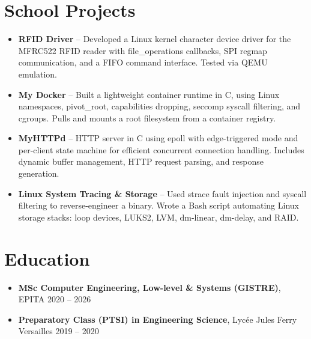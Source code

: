 \documentclass[9pt,a4paper]{article}
\begin{document}
\section*{School Projects}
\begin{tcolorbox}[mybox]
\begin{itemize}
\item \textbf{RFID Driver} -- Developed a Linux kernel character device driver for the MFRC522 RFID reader with file\_operations callbacks, SPI regmap communication, and a FIFO command interface. Tested via QEMU emulation.

\item \textbf{My Docker} -- Built a lightweight container runtime in C, using Linux namespaces, pivot\_root, capabilities dropping, seccomp syscall filtering, and cgroups. Pulls and mounts a root filesystem from a container registry.

\item \textbf{MyHTTPd} -- HTTP server in C using epoll with edge-triggered mode and per-client state machine for efficient concurrent connection handling. Includes dynamic buffer management, HTTP request parsing, and response generation.

\item \textbf{Linux System Tracing \& Storage} -- Used strace fault injection and syscall filtering to reverse-engineer a binary. Wrote a Bash script automating Linux storage stacks: loop devices, LUKS2, LVM, dm-linear, dm-delay, and RAID.
\end{itemize}
\end{tcolorbox}


\section*{Education}
\begin{tcolorbox}[mybox]
\begin{itemize}
\item \textbf{MSc Computer Engineering, Low-level \& Systems (GISTRE)}, EPITA {\small{\hfill 2020 – 2026}}

\item \textbf{Preparatory Class (PTSI) in Engineering Science}, Lycée Jules Ferry Versailles {\small{\hfill 2019 – 2020}}
\end{itemize}
\end{tcolorbox}
\end{document}
